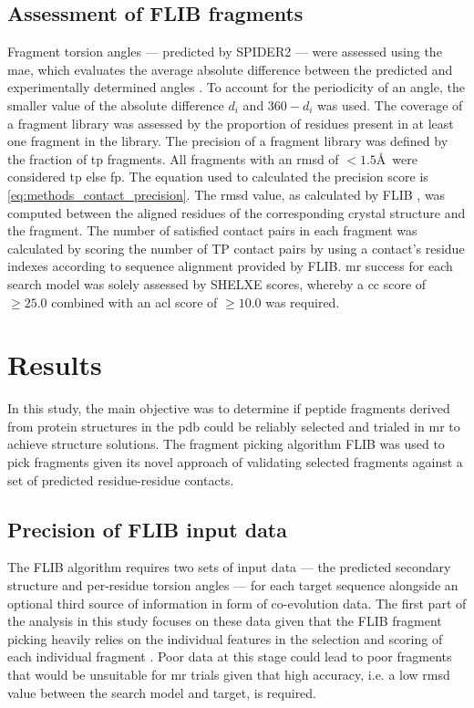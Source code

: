 \subsection{Assessment of FLIB fragments}
Fragment torsion angles --- predicted by SPIDER2 \cite{Heffernan2015-bt} --- were assessed using the \gls{mae}, which evaluates the average absolute difference between the predicted and experimentally determined angles \cite{Heffernan2015-bt}. To account for the periodicity of an angle, the smaller value of the absolute difference $d_i$ and $360-d_i$ was used. The coverage of a fragment library was assessed by the proportion of residues present in at least one fragment in the library. The precision of a fragment library was defined by the fraction of \gls{tp} fragments. All fragments with an \gls{rmsd} of $<1.5$\AA\ were considered \gls{tp} else \gls{fp}. The equation used to calculated the precision score is \cref{eq:methods_contact_precision}. The \gls{rmsd} value, as calculated by FLIB \cite{De_Oliveira2015-kb}, was computed between the aligned residues of the corresponding crystal structure and the fragment. The number of satisfied contact pairs in each fragment was calculated by scoring the number of TP contact pairs by using a contact's residue indexes according to sequence alignment provided by FLIB. \Gls{mr} success for each search model was solely assessed by SHELXE scores, whereby a \gls{cc} score of $\geq25.0$ combined with an \gls{acl} score of $\geq10.0$ was required.

\section{Results}
In this study, the main objective was to determine if peptide fragments derived from protein structures in the \gls{pdb} could be reliably selected and trialed in \gls{mr} to achieve structure solutions. The fragment picking algorithm FLIB \cite{De_Oliveira2015-kb} was used to pick fragments given its novel approach of validating selected fragments against a set of predicted residue-residue contacts.

\subsection{Precision of FLIB input data}
The FLIB algorithm requires two sets of input data --- the predicted secondary structure and per-residue torsion angles --- for each target sequence alongside an optional third source of information in form of co-evolution data. The first part of the analysis in this study focuses on these data given that the FLIB fragment picking heavily relies on the individual features in the selection and scoring of each individual fragment \cite{De_Oliveira2015-kb}. Poor data at this stage could lead to poor fragments that would be unsuitable for \gls{mr} trials given that high accuracy, i.e. a low \gls{rmsd} value between the search model and target, is required.

